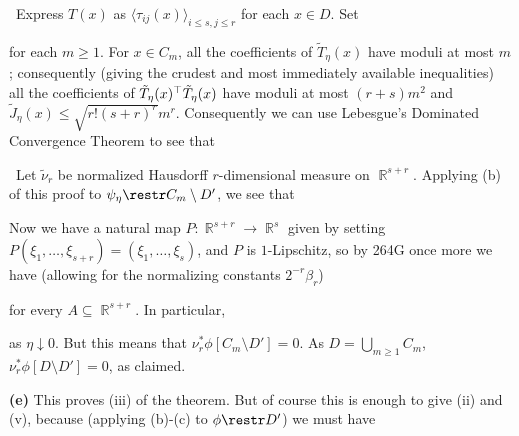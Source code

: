 {\medskip

\quad\grheadb\ Express $T(x)$ as
$\langle\tau_{ij}(x)\rangle_{i\le s,j\le r}$ for each $x\in D$.   Set


\noindent for each $m\ge 1$.   For $x\in C_m$, all the coefficients of
$\tilde T_{\eta}(x)$ have moduli at most $m$;  consequently (giving
the crudest and most immediately available inequalities) all the
coefficients of $\tilde T_{\eta}(x)^{\top} \tilde T_{\eta}(x)$ have moduli at
most $(r+s)m^2$ and $\tilde J_{\eta}(x)\le\sqrt{r!(s+r)^r}m^r$.
Consequently we can use Lebesgue's Dominated Convergence Theorem to
see that


\medskip

\quad\grheadc\ Let $\tilde\nu_r$ be normalized Hausdorff
$r$-dimensional measure on $\BbbR^{s+r}$.   Applying (b) of this proof
to $\psi_{\eta}\restr C_m\setminus D'$, we see that


\noindent Now we have a natural map $P:\BbbR^{s+r}\to\BbbR^s$ given by
setting $P(\xi_1,\ldots,\xi_{s+r})=(\xi_1,\ldots,\xi_s)$, and $P$ is
$1$-Lipschitz, so by 264G once more we have (allowing for
the normalizing constants $2^{-r}\beta_r$)


\noindent for every $A\subseteq\BbbR^{s+r}$.   In particular,


\noindent as $\eta\downarrow 0$.   But this means that
$\nu_r^*\phi[C_m\setminus D']=0$.   As $D=\bigcup_{m\ge 1}C_m$,
$\nu_r^*\phi[D\setminus D']=0$, as claimed.   \Qed

\medskip

{\bf (e)} This proves (iii) of the theorem.   But of course this is
enough to give (ii) and (v), because (applying (b)-(c) to $\phi\restr D'$)
we must have


}
